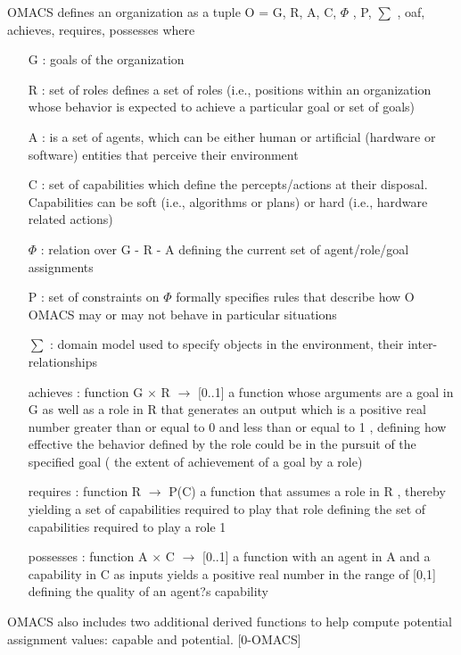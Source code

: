 OMACS defines an organization as a tuple O = \textlangle{} G, R, A, C, $\varPhi$ , P, $\sum$ ,
oaf, achieves, requires, possesses \textrangle{}
where
\begin{itemize}

\item[ G ]  
: goals of the organization 
\item[ R ]  
: set of roles  defines a set of roles (i.e., positions within an organization whose behavior
 is expected to achieve a particular goal or set of goals)
\item[ A ]  
: is a set of agents, which can be either human or artificial (hardware or software)
 entities that perceive their environment
\item[ C ]  
: set of capabilities  which define the percepts/actions at their disposal. Capabilities can be soft 
(i.e., algorithms or plans) or hard (i.e., hardware related actions)
\item[  $\varPhi$ ]  
:  relation over G - R - A defining the current set of agent/role/goal assignments
\item[ P ] 
:  set of constraints on  $\varPhi$  formally specifies rules that describe how O OMACS may or may not 
 behave in particular situations
\item[ $\sum$ ]  
: domain model used to specify objects in the environment, their inter-
relationships
\item[ achieves ]   
: function G $\times$ R $\rightarrow$ {[}0..1{]} a function whose arguments are a goal in G   as well
 as a role in R   that generates an output which is a positive real number greater  than or equal to 0 
 and less than or equal to 1 , defining how effective the behavior
 defined by the role could be in the pursuit of the specified goal   (  the extent of achievement of a goal by a role)
\item[requires] 
: function R $\rightarrow$ P(C)    a function that assumes a role in R  , thereby yielding a set 
of capabilities required to play that role  defining the set of capabilities required to play a role 1
\item[possesses] 
:   function A $\times$ C $\rightarrow$ {[}0..1{]} a function with an agent in A   and a capability in C 
  as inputs yields a positive real number in the range of [0,1] defining the quality of an agent?s capability



\end{itemize}
OMACS also includes two additional derived functions to help compute potential assignment values: 
capable and potential.
[0-OMACS]

